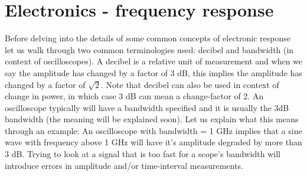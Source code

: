 \documentclass[11pt]{article}
\begin{document}
\newpage
\appendix
\section{Electronics - frequency response}\label{app:electronic-response}
Before delving into the details of some common concepts of electronic response let us walk through two common terminologies used: decibel and bandwidth (in context of oscilloscopes). 
\newline A decibel is a relative unit of measurement and when we say the amplitude has changed by a factor of 3 dB, this implies the amplitude has changed by a factor of $\sqrt{2}$. Note that decibel can also be used in context of change in power, in which case 3 dB can mean a change-factor of 2.
\newline An oscilloscope typically will have a bandwidth specified and it is usually the 3dB bandwidth (the meaning will be explained soon). Let us explain what this means through an example: An oscilloscope with bandwidth = 1 GHz implies that a sine wave with frequency above 1 GHz will have it's amplitude degraded by more than 3 dB. Trying to look at a signal that is too fast for a scope's bandwidth will introduce errors in amplitude and/or time-interval measurements. \cite{hp-catalog-oscilloscopes}

\newpage

\end{document}
